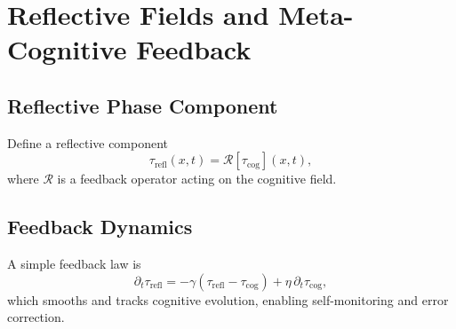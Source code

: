 \chapter{Reflective Fields and Meta-Cognitive Feedback}

\section{Reflective Phase Component}
Define a reflective component
\[
\tau_{\mathrm{refl}}(x,t) = \mathcal{R}[\tau_{\mathrm{cog}}](x,t),
\]
where \(\mathcal{R}\) is a feedback operator acting on the cognitive field.

\section{Feedback Dynamics}
A simple feedback law is
\[
\partial_t \tau_{\mathrm{refl}} = -\gamma\left(\tau_{\mathrm{refl}} - \tau_{\mathrm{cog}}\right) + \eta\,\partial_t \tau_{\mathrm{cog}},
\]
which smooths and tracks cognitive evolution, enabling self-monitoring and error correction.

